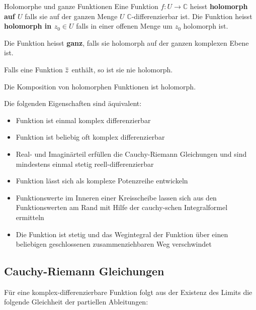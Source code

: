 \documentclass[a4paper,10pt]{article}
\def\C{\mathbb{C}}
\newcommand{\overbar}[1]{\mkern 1.5mu\overline{\mkern-1.5mu#1\mkern-1.5mu}\mkern 1.5mu}
\begin{document}
\begin{mainbox}{Holomorphe und ganze Funktionen}
  Eine Funktion $f: U \to \C$ heisst \textbf{holomorph auf $U$} falls sie auf der ganzen Menge $U$ $\C$-differenzierbar ist. Die Funktion heisst \textbf{holomorph in $z_0 \in U$} falls in einer offenen Menge um $z_0$ holomorph ist.

  Die Funktion heisst \textbf{ganz}, falls sie holomorph auf der ganzen komplexen Ebene ist.
\end{mainbox}

Falls eine Funktion $\overbar{z}$ enthält, so ist sie nie holomorph.

Die Komposition von holomorphen Funktionen ist holomorph.

Die folgenden Eigenschaften sind äquivalent:

\begin{itemize}
  \item Funktion ist einmal komplex differenzierbar
  \item Funktion ist beliebig oft komplex differenzierbar
  \item Real- und Imaginärteil erfüllen die Cauchy-Riemann Gleichungen und sind mindestens einmal stetig reell-differenzierbar
  \item Funktion lässt sich als komplexe Potenzreihe entwickeln
  \item Funktionswerte im Inneren einer Kreisscheibe lassen sich aus den Funktionswerten am Rand mit Hilfe der cauchy-schen Integralformel ermitteln
  \item Die Funktion ist stetig und das Wegintegral der Funktion über einen beliebigen geschlossenen zusammenziehbaren Weg verschwindet
\end{itemize}

\subsection{Cauchy-Riemann Gleichungen}

Für eine komplex-differenzierbare Funktion folgt aus der Existenz des Limits die folgende Gleichheit der partiellen Ableitungen:
\end{document}
